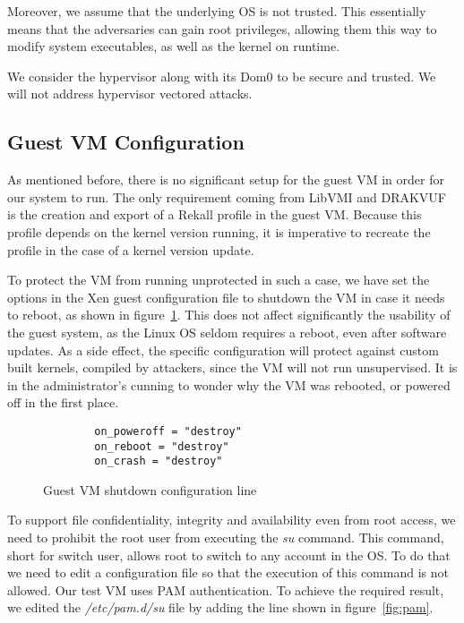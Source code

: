 \par Moreover, we assume that the underlying \ac{OS} is not trusted. This essentially means that the adversaries can gain root privileges, allowing them this way to modify system executables, as well as the kernel on runtime.

\par We consider the hypervisor along with its Dom0 to be secure and trusted. We will not address hypervisor vectored attacks.

\subsection{Guest \ac{VM} Configuration}\label{sub:conf}

As mentioned before, there is no significant setup for the guest \ac{VM} in order for our system to run. The only requirement coming from LibVMI and DRAKVUF is the creation and export of a Rekall profile in the guest \ac{VM}. Because this profile depends on the kernel version running, it is imperative to recreate the profile in the case of a kernel version update. 
\par To protect the \ac{VM} from running unprotected in such a case, we have set the options in the Xen guest configuration file to shutdown the \ac{VM} in case it needs to reboot, as shown in figure~\ref{fig:conf}. This does not affect significantly the usability of the guest system, as the Linux \ac{OS} seldom requires a reboot, even after software updates. As a side effect, the specific configuration will protect against custom built kernels, compiled by attackers, since the \ac{VM} will not run unsupervised. It is in the administrator's cunning to wonder why the \ac{VM} was rebooted, or powered off in the first place.

\begin{figure}[ht]
	\centering
	\begin{lstlisting}
		on_poweroff = "destroy"
		on_reboot = "destroy"
		on_crash = "destroy"
	\end{lstlisting}
	\caption{Guest \ac{VM} shutdown configuration line}
	\label{fig:conf}
\end{figure}

\par To support file confidentiality, integrity and availability even from root access, we need to prohibit the root user from executing the \textit{su} command. This command, short for switch user, allows root to switch to any account in the \ac{OS}. To do that we need to edit a configuration file so that the execution of this command is not allowed. Our test \ac{VM} uses \ac{PAM} authentication. To achieve the required result, we edited the \textit{/etc/pam.d/su} file by adding the line shown in figure~\ref{fig:pam}.

